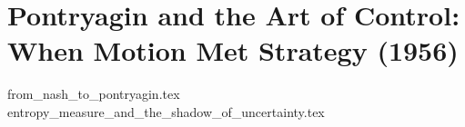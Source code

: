 \section{Pontryagin and the Art of Control: When Motion Met Strategy (1956)}

{from_nash_to_pontryagin.tex}
{entropy_measure_and_the_shadow_of_uncertainty.tex}
